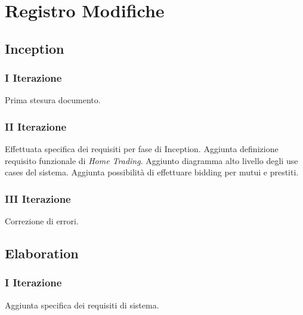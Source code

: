 \documentclass[10pt]{softeng} %
\begin{document}
\startofdocument{}













\appendix

\section{Registro Modifiche}

\subsection{Inception}

\subsubsection{I Iterazione}

Prima stesura documento.

\subsubsection{II Iterazione}

Effettuata specifica dei requisiti per fase di Inception.
Aggiunta definizione requisito funzionale di \emph{Home Trading}.
Aggiunto diagramma alto livello degli use cases del sistema.
Aggiunta possibilit\`a di effettuare bidding per mutui e prestiti.

\subsubsection{III Iterazione}

Correzione di errori.

\subsection{Elaboration}

\subsubsection{I Iterazione}

Aggiunta specifica dei requisiti di sistema.
\end{document}
